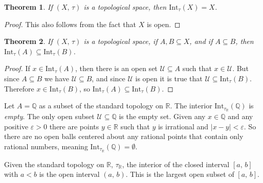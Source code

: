 \documentclass{article}
\theoremstyle{plain}
\newtheorem{theorem}{Theorem}[section]
\theoremstyle{normal}
\newenvironment{example}{%
    \pushQED{\qed}\renewcommand{\qedsymbol}{$\blacksquare$}\examplex%
}{%
    \popQED\endexamplex%
}
\begin{document}
        \begin{theorem}
            If $(X,\,\tau)$ is a topological space, then
            $\textrm{Int}_{\tau}(X)=X$.
        \end{theorem}
        \begin{proof}
            This also follows from the fact that $X$ is open.
        \end{proof}
        \begin{theorem}
            If $(X,\,\tau)$ is a topological space, if $A,B\subseteq{X}$, and
            if $A\subseteq{B}$, then
            $\textrm{Int}_{\tau}(A)\subseteq\textrm{Int}_{\tau}(B)$.
        \end{theorem}
        \begin{proof}
            If $x\in\textrm{Int}_{\tau}(A)$, then there is an open set
            $\mathcal{U}\subseteq{A}$ such that $x\in\mathcal{U}$. But since
            $A\subseteq{B}$ we have $\mathcal{U}\subseteq{B}$, and since
            $\mathcal{U}$ is open it is true that
            $\mathcal{U}\subseteq\textrm{Int}_{\tau}(B)$. Therefore
            $x\in\textrm{Int}_{\tau}(B)$, so
            $\textrm{Int}_{\tau}(A)\subseteq\textrm{Int}_{\tau}(B)$.
        \end{proof}
        \begin{example}
            Let $A=\mathbb{Q}$ as a subset of the standard topology on
            $\mathbb{R}$. The interior
            $\textrm{Int}_{\tau_{\mathbb{R}}}(\mathbb{Q})$ is \textit{empty}.
            The only open subset $\mathcal{U}\subseteq\mathbb{Q}$ is the empty
            set. Given any $x\in\mathbb{Q}$ and any positive $\varepsilon>0$
            there are points $y\in\mathbb{R}$ such that $y$ is irrational
            and $|x-y|<\varepsilon$. So there are no open balls centered about
            any rational points that contain only rational numbers, meaning
            $\textrm{Int}_{\tau_{\mathbb{R}}}(\mathbb{Q})=\emptyset$.
        \end{example}
        \begin{example}
            Given the standard topology on $\mathbb{R}$, $\tau_{\mathbb{R}}$,
            the interior of the closed interval $[a,\,b]$ with
            $a<b$ is the open interval $(a,\,b)$. This is the largest open
            subset of $[a,\,b]$.
        \end{example}
\end{document}
